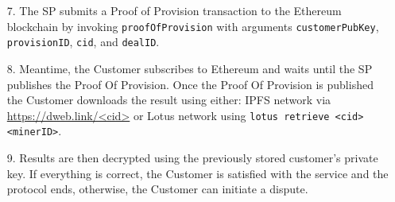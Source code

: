 \documentclass[pdftex,twocolumn,epjc3]{svjour3}
\begin{document}
{\begin{enumerate}
  \item[7.] The SP submits a Proof of Provision transaction to the Ethereum blockchain by invoking \texttt{proofOfProvision} with arguments \texttt{customer\-PubKey}, \texttt{provisionID}, \texttt{cid}, and \texttt{dealID}.

  \item[8.] Meantime, the Customer subscribes to Ethereum and waits until the SP publishes the Proof Of Provision.
 Once the Proof Of Provision is published the Customer downloads the result using either: IPFS network via \url{https://dweb.link/<cid>} or Lotus network using \texttt{lotus retrieve <cid> <minerID>}. 
 
  \item[9.] Results are then decrypted using the previously stored customer's private key. If everything is correct, the Customer is satisfied with the service and the protocol ends, otherwise, the Customer can initiate a dispute.

\end{enumerate}



}
\end{document}
